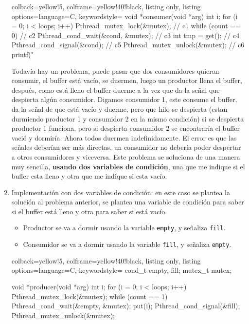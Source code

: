 \documentclass[openany]{book}
\begin{document}
\begin{enumerate}
\begin{tcblisting}{colback=yellow!5, colframe=yellow!40!black, listing only, listing options={language=C, keywordstyle=\color{blue!35!white}\bfseries}}
        void *consumer(void *arg) {
            int i;
            for (i = 0; i < loops; i++) {
                Pthread_mutex_lock(&mutex); // c1
                while (count == 0) // c2
                    Pthread_cond_wait(&cond, &mutex); // c3
                int tmp = get(); // c4
                Pthread_cond_signal(&cond); // c5
                Pthread_mutex_unlock(&mutex); // c6
                printf("%
            }
        }
        \end{tcblisting}
        Todavía hay un problema, puede pasar que dos consumidores quieran consumir, el buffer está vacío, se duermen, luego un productor llena el buffer, después, como está lleno el buffer duerme a la vez que da la señal que despierta algún consumidor. Digamos consumidor 1, este consume el buffer, da la señal de que está vacío y duerme, pero que hilo se despierta (estan durmiendo productor 1 y consumidor 2 en la mismo condición) si se despierta productor 1 funciona, pero si despierta consumidor 2 se encontraría el buffer vació y dormiría. Ahora todos duermen indefinidamente. El error es que las señales deberían ser más directas, un consumidor no debería poder despertar a otros consumidores y viceversa. Este problema se soluciona de una manera muy sencilla, \textbf{usando dos variables de condición}, una que me indique si el buffer esta lleno y otra que me indique si esta vacío.

        \newpage
        \item Implementación con dos variables de condición: en este caso se plantea la solución al problema anterior, se plantea una variable de condición para saber si el buffer está lleno y otra para saber si está vacío.
        \begin{itemize}
            \item Productor se va a dormir usando la variable \texttt{empty}, y señaliza \texttt{fill}.
            \item Consumidor se va a dormir usando la variable \texttt{fill}, y señaliza \texttt{empty}.
        \end{itemize}
        \begin{tcblisting}{colback=yellow!5, colframe=yellow!40!black, listing only, listing options={language=C, keywordstyle=\color{blue!35!white}\bfseries}}
        cond_t empty, fill;
        mutex_t mutex;
            
        void *producer(void *arg) {
            int i;
            for (i = 0; i < loops; i++) {
                Pthread_mutex_lock(&mutex);
                while (count == 1)
                    Pthread_cond_wait(&empty, &mutex);
                put(i);
                Pthread_cond_signal(&fill);
                Pthread_mutex_unlock(&mutex);
            }
        }
            

\end{tcblisting}
\end{enumerate}
\end{document}
